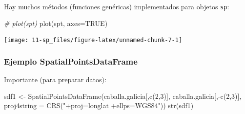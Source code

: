 \documentclass[
  spanish,
]{book}
\newenvironment{Shaded}{\begin{snugshade}}{\end{snugshade}}
\newcommand{\AttributeTok}[1]{\textcolor[rgb]{0.77,0.63,0.00}{#1}}
\newcommand{\CommentTok}[1]{\textcolor[rgb]{0.56,0.35,0.01}{\textit{#1}}}
\newcommand{\ConstantTok}[1]{\textcolor[rgb]{0.00,0.00,0.00}{#1}}
\newcommand{\DecValTok}[1]{\textcolor[rgb]{0.00,0.00,0.81}{#1}}
\newcommand{\FunctionTok}[1]{\textcolor[rgb]{0.00,0.00,0.00}{#1}}
\newcommand{\NormalTok}[1]{#1}
\newcommand{\OtherTok}[1]{\textcolor[rgb]{0.56,0.35,0.01}{#1}}
\newcommand{\SpecialCharTok}[1]{\textcolor[rgb]{0.00,0.00,0.00}{#1}}
\newcommand{\StringTok}[1]{\textcolor[rgb]{0.31,0.60,0.02}{#1}}
\theoremstyle{break}
\theoremstyle{definition}
\theoremstyle{definition}
\theoremstyle{definition}
\theoremstyle{definition}
\theoremstyle{remark}
\begin{document}
Hay muchos métodos (funciones genéricas) implementados para objetos \texttt{sp}:

\begin{Shaded}
\begin{Highlighting}[]
\CommentTok{\# plot(spt)}
\FunctionTok{plot}\NormalTok{(spt, }\AttributeTok{axes=}\ConstantTok{TRUE}\NormalTok{)}
\end{Highlighting}
\end{Shaded}

\begin{center}\texttt{[image: 11-sp\_files/figure-latex/unnamed-chunk-7-1]} \end{center}

\hypertarget{ejemplo-spatialpointsdataframe}{%
\subsubsection{Ejemplo SpatialPointsDataFrame}\label{ejemplo-spatialpointsdataframe}}

Importante (para preparar datos):

\begin{Shaded}
\begin{Highlighting}[]
\NormalTok{sdf1 }\OtherTok{\textless{}{-}} \FunctionTok{SpatialPointsDataFrame}\NormalTok{(caballa.galicia[,}\FunctionTok{c}\NormalTok{(}\DecValTok{2}\NormalTok{,}\DecValTok{3}\NormalTok{)], caballa.galicia[,}\SpecialCharTok{{-}}\FunctionTok{c}\NormalTok{(}\DecValTok{2}\NormalTok{,}\DecValTok{3}\NormalTok{)], }\AttributeTok{proj4string =} \FunctionTok{CRS}\NormalTok{(}\StringTok{"+proj=longlat +ellps=WGS84"}\NormalTok{))}
\FunctionTok{str}\NormalTok{(sdf1)}
\end{Highlighting}
\end{Shaded}
\end{document}
